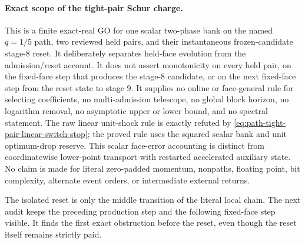 \paragraph{Exact scope of the tight-pair Schur charge.}
This is a finite exact-real GO for one scalar two-phase bank on the named
$q=1/5$ path, two reviewed held pairs, and their instantaneous
frozen-candidate stage-$8$ reset.  It deliberately separates held-face
evolution from the admission/reset account.  It does not assert monotonicity
on every held pair, on the fixed-face step that produces the stage-$8$
candidate, or on the next fixed-face step from the reset state to stage $9$.
It supplies no online or face-general rule for selecting coefficients, no
multi-admission telescope, no global block horizon, no logarithm removal, no
asymptotic upper or lower bound, and no spectral statement.  The raw linear
unit-shock rule is exactly refuted by
\cref{eq:path-tight-pair-linear-switch-stop}; the proved rule uses the
squared scalar bank and unit optimum-drop reserve.  This scalar face-error
accounting is distinct from coordinatewise lower-point transport with
restarted accelerated auxiliary state.  No claim is made for literal
zero-padded momentum, nonpaths, floating point, bit complexity, alternate
event orders, or intermediate external returns.

The isolated reset is only the middle transition of the literal local chain.
The next audit keeps the preceding production step and the following
fixed-face step visible.  It finds the first exact obstruction before the
reset, even though the reset itself remains strictly paid.

